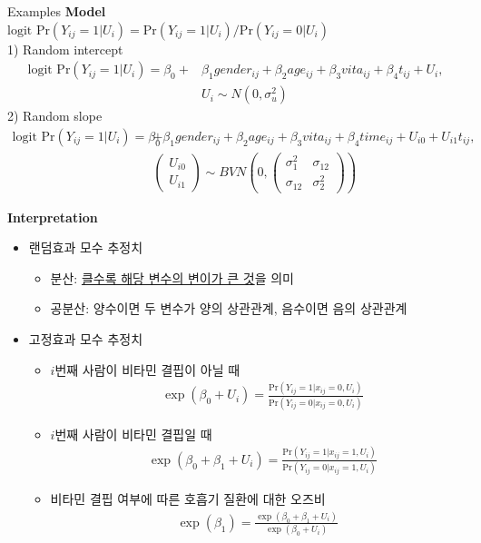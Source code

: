 \documentclass[9pt, xelatex]{beamer}
\begin{document}
{\begin{frame}[allowframebreaks]{Examples}
	\textbf{Model}\\
	\vspace{2mm}
	$\text{logit Pr}(Y_{ij}=1 \vert U_i) = \text{Pr}(Y_{ij}=1 \vert U_i) / \text{Pr}(Y_{ij}=0 \vert U_i)$ \\
	\vspace{2mm}
	1)  Random intercept				
	\begin{align*}
		 \text{logit Pr}(Y_{ij}=1 \vert U_i) =  \beta_0 + & \beta_1 gender_{ij}+ \beta_2 age_{ij}+ \beta_3 vita_{ij}+	 \beta_4 t_{ij} + U_i,  \\
		 & U_i \sim N(0, \sigma_u^2)		
	\end{align*}
	2)  Random slope 
	\begin{align*}
		 \text{logit Pr}(Y_{ij}=1 \vert U_i) =   \beta_0 & + \beta_1 gender_{ij}+ \beta_2 age_{ij}+ \beta_3 vita_{ij}+	 \beta_4 time_{ij} + U_{i0} + U_{i1}t_{ij}, \\ 
		& \begin{pmatrix}
			U_{i0} \\ U_{i1}
			\end{pmatrix}
			\sim BVN\left(0,
			 \begin{pmatrix}
				\sigma_1^2 & \sigma_{12} \\
				\sigma_{12} & \sigma_2^2
			\end{pmatrix}\right)	
	\end{align*}

	\framebreak
	\textbf{Interpretation} \\
	\begin{itemize}
		\item 랜덤효과 모수 추정치 
			\begin{itemize}
				\item 분산: \underline{클수록 해당 변수의 변이가 큰 것}을 의미\\
				\item 공분산: 양수이면 두 변수가 양의 상관관계, 음수이면 음의 상관관계\\		
			\end{itemize}
		\item 고정효과 모수 추정치
			\begin{itemize}
				\item $i$번째 사람이 비타민 결핍이 아닐 때
					\begin{align*}
						& \exp (\beta_0+U_i) =  \frac{\text{Pr}(Y_{ij}=1 \vert x_{ij}=0, U_i)}{\text{Pr}(Y_{ij}=0 \vert x_{ij}=0, U_i)} 
					\end{align*} 
				\item $i$번째 사람이 비타민 결핍일 때 
				\begin{align*}
					& \exp (\beta_0+ \beta_1 + U_i) =  \frac{\text{Pr}(Y_{ij}=1 \vert x_{ij}=1, U_i)}{\text{Pr}(Y_{ij}=0 \vert x_{ij}=1, U_i)} 
				\end{align*} 
				\item 비타민 결핍 여부에 따른 호흡기 질환에 대한 오즈비 
				\begin{align*}
					\exp (\beta_1) = \frac{\exp(\beta_0 + \beta_1+U_i)}{\exp(\beta_0+U_i)}
				\end{align*}		
			\end{itemize}
	\end{itemize}
	

\end{frame}}
\end{document}

